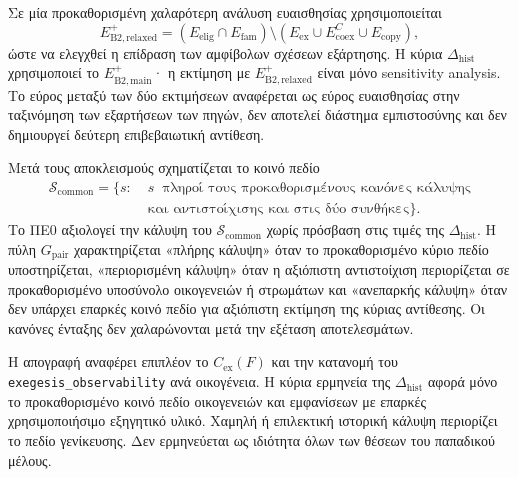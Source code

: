 \documentclass[11pt,a4paper]{article}
\begin{document}
Σε μία προκαθορισμένη χαλαρότερη ανάλυση ευαισθησίας χρησιμοποιείται
\[
E_{\mathrm{B2,relaxed}}^+=(E_{\mathrm{elig}}\cap E_{\mathrm{fam}})\setminus(E_{\mathrm{ex}}\cup E_{\mathrm{coex}}^{C}\cup E_{\mathrm{copy}}),
\]
ώστε να ελεγχθεί η επίδραση των αμφίβολων σχέσεων εξάρτησης. Η κύρια $\Delta_{\mathrm{hist}}$ χρησιμοποιεί το $E_{\mathrm{B2,main}}^+$· η εκτίμηση με $E_{\mathrm{B2,relaxed}}^+$ είναι μόνο sensitivity analysis. Το εύρος μεταξύ των δύο εκτιμήσεων αναφέρεται ως εύρος ευαισθησίας στην ταξινόμηση των εξαρτήσεων των πηγών, δεν αποτελεί διάστημα εμπιστοσύνης και δεν δημιουργεί δεύτερη επιβεβαιωτική αντίθεση.

Μετά τους αποκλεισμούς σχηματίζεται το κοινό πεδίο
\[
\begin{aligned}
\mathcal S_{\mathrm{common}}=\{s:\;& s\ \text{ πληροί τους προκαθορισμένους κανόνες κάλυψης}\\
&\text{και αντιστοίχισης και στις δύο συνθήκες}\}.
\end{aligned}
\]
Το ΠΕ0 αξιολογεί την κάλυψη του $\mathcal S_{\mathrm{common}}$ χωρίς πρόσβαση στις τιμές της $\Delta_{\mathrm{hist}}$. Η πύλη $G_{\mathrm{pair}}$ χαρακτηρίζεται «πλήρης κάλυψη» όταν το προκαθορισμένο κύριο πεδίο υποστηρίζεται, «περιορισμένη κάλυψη» όταν η αξιόπιστη αντιστοίχιση περιορίζεται σε προκαθορισμένο υποσύνολο οικογενειών ή στρωμάτων και «ανεπαρκής κάλυψη» όταν δεν υπάρχει επαρκές κοινό πεδίο για αξιόπιστη εκτίμηση της κύριας αντίθεσης. Οι κανόνες ένταξης δεν χαλαρώνονται μετά την εξέταση αποτελεσμάτων.

Η απογραφή αναφέρει επιπλέον το $C_{\mathrm{ex}}(F)$ και την κατανομή του \texttt{exegesis\_observability} ανά οικογένεια. Η κύρια ερμηνεία της $\Delta_{\mathrm{hist}}$ αφορά μόνο το προκαθορισμένο κοινό πεδίο οικογενειών και εμφανίσεων με επαρκές χρησιμοποιήσιμο εξηγητικό υλικό. Χαμηλή ή επιλεκτική ιστορική κάλυψη περιορίζει το πεδίο γενίκευσης. Δεν ερμηνεύεται ως ιδιότητα όλων των θέσεων του παπαδικού μέλους.
\end{document}
